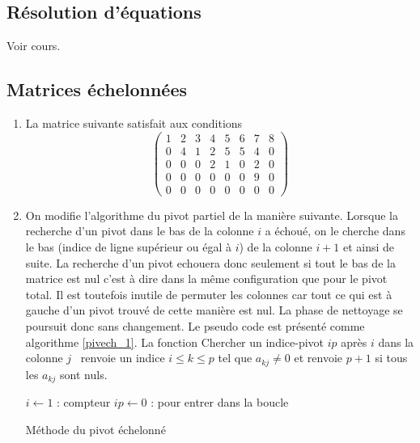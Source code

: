 \subsection{Résolution d'équations}
Voir cours.

\subsection{Matrices échelonnées}
\begin{enumerate}
  \item La matrice suivante satisfait aux conditions
\begin{displaymath}
\begin{pmatrix}
  1 & 2 & 3 & 4 & 5 & 6 & 7 & 8 \\
  0 & 4 & 1 & 2 & 5 & 5 & 4 & 0 \\
  0 & 0 & 0 & 2 & 1 & 0 & 2 & 0 \\
  0 & 0 & 0 & 0 & 0 & 0 & 9 & 0 \\
  0 & 0 & 0 & 0 & 0 & 0 & 0 & 0 
\end{pmatrix}  
\end{displaymath}

  \item On modifie l'algorithme du pivot partiel de la manière suivante.\newline
Lorsque la recherche d'un pivot dans le bas de la colonne $i$ a échoué, on le cherche dans le bas (indice de ligne supérieur ou égal à $i$) de la colonne $i+1$ et ainsi de suite. La recherche d'un pivot echouera donc seulement si tout le bas de la matrice est nul c'est à dire dans la même configuration que pour le pivot total. Il est toutefois inutile de permuter les colonnes car tout ce qui est à gauche d'un pivot trouvé de cette manière est nul. La phase de nettoyage se poursuit donc sans changement. Le pseudo code est présenté comme algorithme \ref{pivech_1}.\newline
La fonction \og Chercher un indice-pivot $ip$ après $i$ dans la colonne $j$\fg ~  renvoie un indice $i\leq k\leq p$ tel que $a_{k j}\neq 0$ et renvoie $p+1$ si tous les $a_{k j}$ sont nuls. 
\begin{algorithm}[h]
  $i\leftarrow 1$ : compteur\;
  $ip\leftarrow  0$ : pour entrer dans la boucle\;
  \caption{Méthode du pivot échelonné}
  \label{pivech_1}
\end{algorithm}


\end{enumerate}
